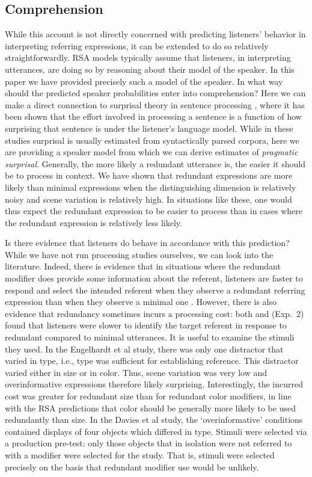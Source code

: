 \documentclass[11pt]{article}
\begin{document}
\subsection{Comprehension}

While this account is not directly concerned with predicting listeners' behavior in interpreting referring expressions, it can be extended to do so relatively straightforwardly. RSA models typically assume that listeners, in interpreting utterances, are doing so by reasoning about their model of the speaker. In this paper we have provided precisely such a model of the speaker. In what way should the predicted speaker probabilities enter into comprehension? Here we can make a direct connection to surprisal theory in sentence processing \cite{levy2008}, where it has been shown that the effort involved in processing a sentence is a function of how surprising that sentence is under the listener's language model. While in these studies surprisal is usually estimated from syntactically parsed corpora, here we are providing a speaker model from which we can derive estimates of \emph{pragmatic surprisal}. Generally, the more likely a redundant utterance is, the easier it should be to process in context. We have shown that redundant expressions are more likely than minimal expressions when the distinguishing dimension is relatively noisy and scene variation is relatively high. In situations like these, one would thus expect the redundant expression to be easier to process than in cases where the redundant expression is relatively less likely. 

Is there evidence that listeners do behave in accordance with this prediction? While we have not run processing studies ourselves, we can look into the literature. Indeed, there is evidence that in situations where the redundant modifier does provide some information about the referent, listeners are faster to respond and select the intended referent when they observe a redundant referring expression than when they observe a minimal one \cite{Arts2011,  Paraboni2007}. However, there is also evidence that redundancy sometimes incurs a processing cost: both  and  (Exp.~2) found that listeners were slower to identify the target referent in response to redundant compared to minimal utterances. It is useful to examine the stimuli they used. In the Engelhardt et al study, there was only one distractor that varied in type, i.e., type was sufficient for establishing reference. This distractor varied either in size or in color. Thus, scene variation was very low and overinformative expressions therefore likely surprising. Interestingly, the incurred cost was greater for redundant size than for redundant color modifiers, in line with the RSA predictions that color should be generally more likely to be used redundantly than size. In the Davies et al study, the `overinformative' conditions contained displays of four objects which differed in type. Stimuli were selected via a production pre-test: only those objects that in isolation were not referred to with a modifier were selected for the study. That is, stimuli were selected precisely on the basis that redundant modifier use would be unlikely.
\end{document}
